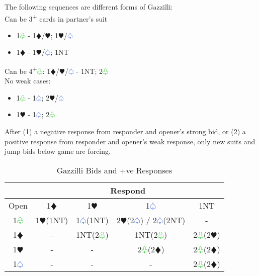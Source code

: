 \documentclass{article}
\renewcommand{\sp}{\textcolor{RoyalBlue}{$\varspade$}}
\newcommand{\he}{\textcolor{RubineRed}{$\varheart$}}
\newcommand{\di}{\textcolor{Peach}{$\vardiamond$}}
\newcommand{\cl}{\textcolor{LimeGreen}{$\varclub$}}
\newcommand{\nt}{\relsize{-1}NT\relsize{1}}
\newcommand{\up}{\textsuperscript{+}}
\begin{document}
The following sequences are different forms of Gazzilli: \\
Can be 3\up{} cards in partner's suit
\begin{itemize}
	\itemsep0em
	\item 1\cl{} - 1\di{}/\he{}; 1\he{}/\sp{}
	\item 1\di{} - 1\he{}/\sp{}; 1\nt{}
\end{itemize}
Can be 4\up{}\cl{}: 1\di{}/\he{}/\sp{} - 1\nt{}; 2\cl{} \\

No weak cases: 
\begin{itemize}
	\itemsep0em
	\item 1\cl{} - 1\sp{}; 2\he{}/\sp{}
	\item 1\he{} - 1\sp{}; 2\cl{}
\end{itemize}


After (1) a negative response from responder and opener’s strong bid, or (2) a positive response from responder and opener’s weak response, only new suits and jump bids below game are forcing. 

\begin{table}[htbp]
    \centering
    \caption{Gazzilli Bids and +ve Responses}
    \begin{tabular}{|c|c|c|c|c|}
        \hline
         & \multicolumn{4}{|c|}{Respond} \\\hline
        Open & 1\di{} & 1\he{} & 1\sp{} & 1\nt{} \\\hline
        1\cl{} & 1\he{}(1\nt{}) & 1\sp{}(1\nt{}) & 2\he{}(2\sp{}) / 2\sp{}(2\nt) & - \\\hline
        1\di{} & - & 1\nt{}(2\cl) & 1\nt{}(2\cl{}) & 2\cl{}(2\he{}) \\\hline
        1\he{} & - & - & 2\cl{}(2\di{}) & 2\cl{}(2\di{}) \\\hline
        1\sp{} & - & - & - & 2\cl{}(2\di{}) \\\hline
    \end{tabular}
\end{table}

\medskip
\end{document}
